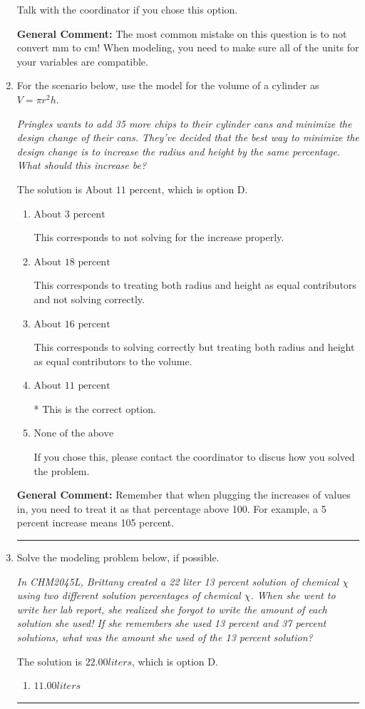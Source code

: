 \documentclass{extbook}[14pt]
\newcommand{\litem}[1]{\item #1

\rule{\textwidth}{0.4pt}}
\begin{document}
\begin{enumerate}
{\begin{enumerate}[label=\Alph*.]
Talk with the coordinator if you chose this option.
\end{enumerate}

\textbf{General Comment:} The most common mistake on this question is to not convert mm to cm! When modeling, you need to make sure all of the units for your variables are compatible.
}
\litem{
For the scenario below, use the model for the volume of a cylinder as $V = \pi r^2 h$.

\begin{center}
    \textit{ Pringles wants to add 35 \text{percent} more chips to their cylinder cans and minimize the design change of their cans. They've decided that the best way to minimize the design change is to increase the radius and height by the same percentage. What should this increase be? }
\end{center}
The solution is \( \text{About } 11 \text{ percent} \), which is option D.\begin{enumerate}[label=\Alph*.]
\item \( \text{About } 3 \text{ percent} \)

This corresponds to not solving for the increase properly.
\item \( \text{About } 18 \text{ percent} \)

This corresponds to treating both radius and height as equal contributors and not solving correctly.
\item \( \text{About } 16 \text{ percent} \)

This corresponds to solving correctly but treating both radius and height as equal contributors to the volume.
\item \( \text{About } 11 \text{ percent} \)

* This is the correct option.
\item \( \text{None of the above} \)

If you chose this, please contact the coordinator to discus how you solved the problem.
\end{enumerate}

\textbf{General Comment:} Remember that when plugging the increases of values in, you need to treat it as that percentage above 100. For example, a 5 percent increase means 105 percent.
}
\litem{
Solve the modeling problem below, if possible.

\begin{center}
    \textit{ In CHM2045L, Brittany created a 22 liter 13 percent solution of chemical $\chi$ using two different solution percentages of chemical $\chi$. When she went to write her lab report, she realized she forgot to write the amount of each solution she used! If she remembers she used 13 percent and 37 percent solutions, what was the amount she used of the 13 percent solution? }
\end{center}
The solution is \( 22.00 liters \), which is option D.\begin{enumerate}[label=\Alph*.]
\item \( 11.00 liters \)


\end{enumerate}}
\end{enumerate}
\end{document}
